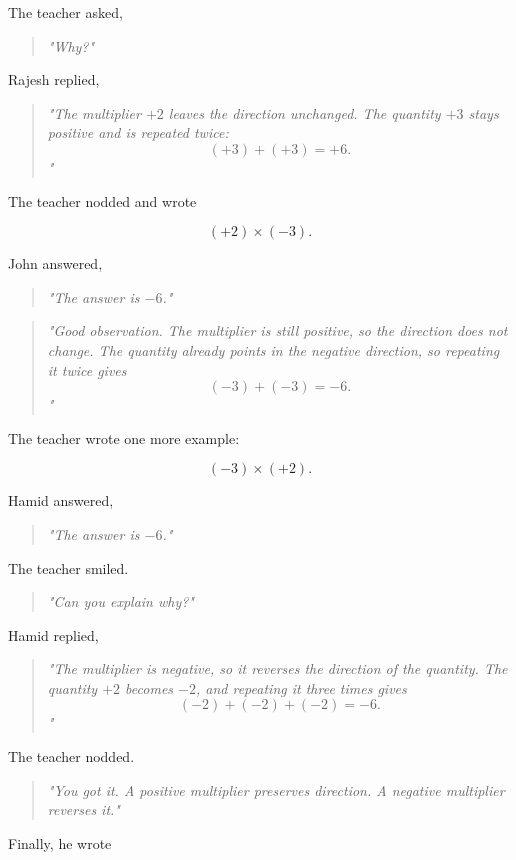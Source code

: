 \documentclass[11pt]{article}
\begin{document}
The teacher asked,

\begin{quote}
\emph{"Why?"}
\end{quote}

Rajesh replied,

\begin{quote}
\emph{"The multiplier \(+2\) leaves the direction unchanged. The quantity \(+3\) stays positive and is repeated twice:
\[
(+3)+(+3)=+6.
\]"}
\end{quote}

The teacher nodded and wrote

\[
(+2)\times(-3).
\]

John answered,

\begin{quote}
\emph{"The answer is \(-6\)."}
\end{quote}

\begin{quote}
\emph{"Good observation. The multiplier is still positive, so the direction does not change. The quantity already points in the negative direction, so repeating it twice gives
\[
(-3)+(-3)=-6.
\]"}
\end{quote}

The teacher wrote one more example:

\[
(-3)\times(+2).
\]

Hamid answered,

\begin{quote}
\emph{"The answer is \(-6\)."}
\end{quote}

The teacher smiled.

\begin{quote}
\emph{"Can you explain why?"}
\end{quote}

Hamid replied,

\begin{quote}
\emph{"The multiplier is negative, so it reverses the direction of the quantity. The quantity \(+2\) becomes \(-2\), and repeating it three times gives
\[
(-2)+(-2)+(-2)=-6.
\]"}
\end{quote}

The teacher nodded.

\begin{quote}
\emph{"You got it. A positive multiplier preserves direction. A negative multiplier reverses it."}
\end{quote}

Finally, he wrote
\end{document}
